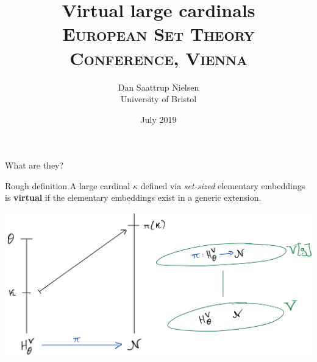 \documentclass{beamer}
\title[Virtual large cardinals]{Virtual large cardinals\\ {\small\textsc{European Set Theory Conference, Vienna}}}
\author[Dan Saattrup Nielsen]{Dan Saattrup Nielsen\\ University of Bristol}
\date{July 2019}
\begin{document}
{

\begin{frame}
	\titlepage
\end{frame}
}

\begin{frame}{What are they?}
  \begin{block}{Rough definition}
    A large cardinal $\kappa$ defined via \textit{set-sized} elementary embeddings is \textbf{virtual} if the elementary embeddings exist in a generic extension.
  \end{block}

  \begin{center}
    \includegraphics[scale=0.17]{gfx/virtual.jpg}
  \end{center}
\end{frame}
\end{document}
